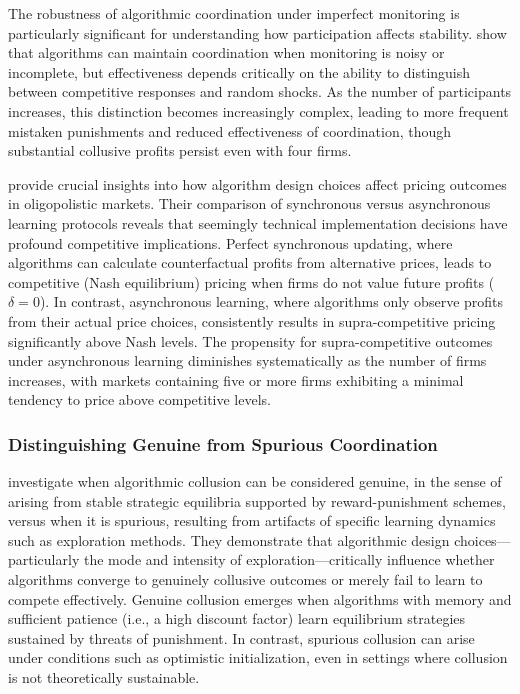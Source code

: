 The robustness of algorithmic coordination under imperfect monitoring is particularly significant for understanding how participation affects stability. \textcite{calvano_algorithmic_2021} show that algorithms can maintain coordination when monitoring is noisy or incomplete, but effectiveness depends critically on the ability to distinguish between competitive responses and random shocks. As the number of participants increases, this distinction becomes increasingly complex, leading to more frequent mistaken punishments and reduced effectiveness of coordination, though substantial collusive profits persist even with four firms.

\textcite{asker_artificial_2022, asker_impact_2024} provide crucial insights into how algorithm design choices affect pricing outcomes in oligopolistic markets. Their comparison of synchronous versus asynchronous learning protocols reveals that seemingly technical implementation decisions have profound competitive implications. Perfect synchronous updating, where algorithms can calculate counterfactual profits from alternative prices, leads to competitive (Nash equilibrium) pricing when firms do not value future profits ($\delta = 0$). In contrast, asynchronous learning, where algorithms only observe profits from their actual price choices, consistently results in supra-competitive pricing significantly above Nash levels. The propensity for supra-competitive outcomes under asynchronous learning diminishes systematically as the number of firms increases, with markets containing five or more firms exhibiting a minimal tendency to price above competitive levels.

\subsubsection*{Distinguishing Genuine from Spurious Coordination}

\textcite{calvano_algorithmic_2023} investigate when algorithmic collusion can be considered genuine, in the sense of arising from stable strategic equilibria supported by reward-punishment schemes, versus when it is spurious, resulting from artifacts of specific learning dynamics such as exploration methods. They demonstrate that algorithmic design choices—particularly the mode and intensity of exploration—critically influence whether algorithms converge to genuinely collusive outcomes or merely fail to learn to compete effectively. Genuine collusion emerges when algorithms with memory and sufficient patience (i.e., a high discount factor) learn equilibrium strategies sustained by threats of punishment. In contrast, spurious collusion can arise under conditions such as optimistic initialization, even in settings where collusion is not theoretically sustainable.

